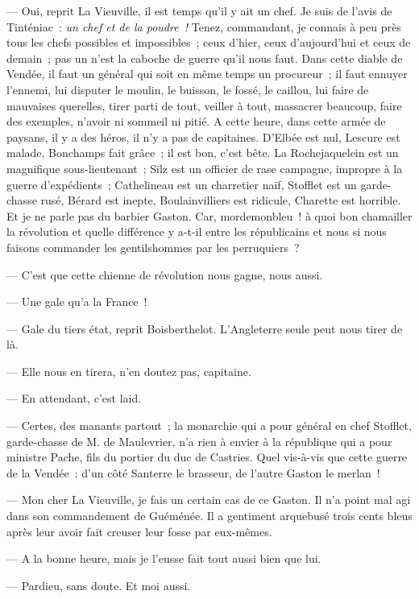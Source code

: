 \documentclass[french,twoside]{book} %
\begin{document}
— Oui, reprit La Vieuville, il est temps qu’il y ait un chef. Je suis de l’avis de Tinténiac : \emph{un chef et de la poudre !} Tenez, commandant, je connais à peu près tous les chefs possibles et impossibles ; ceux d’hier, ceux d’aujourd’hui et ceux de demain ; pas un n’est la caboche de guerre qu’il nous faut. Dans cette diable de Vendée, il faut un général qui soit en même temps un procureur ; il faut ennuyer l’ennemi, lui disputer le moulin, le buisson, le fossé, le caillou, lui faire de mauvaises querelles, tirer parti de tout, veiller à tout, massacrer beaucoup, faire des exemples, n’avoir ni sommeil ni pitié. A cette heure, dans cette armée de paysans, il y a des héros, il n’y a pas de capitaines. D’Elbée est nul, Lescure est malade, Bonchamps fait grâce ; il est bon, c’est bête. La Rochejaquelein est un magnifique sous-lieutenant ; Silz est un officier de rase campagne, impropre à la guerre d’expédients ; Cathelineau est un charretier naïf, Stofflet est un garde-chasse rusé, Bérard est inepte, Boulainvilliers est ridicule, Charette est horrible. Et je ne parle pas  du barbier Gaston. Car, mordemonbleu ! à quoi bon chamailler la révolution et quelle différence y a-t-il entre les républicains et nous si nous faisons commander les gentilshommes par les perruquiers ?\par
— C’est que cette chienne de révolution nous gagne, nous aussi.\par
— Une gale qu’a la France !\par
— Gale du tiers état, reprit Boisberthelot. L’Angleterre seule peut nous tirer de là.\par
— Elle nous en tirera, n’en doutez pas, capitaine.\par
— En attendant, c’est laid.\par
— Certes, des manants partout ; la monarchie qui a pour général en chef Stofflet, garde-chasse de M. de Maulevrier, n’a rien à envier à la république qui a pour ministre Pache, fils du portier du duc de Castries. Quel vis-à-vis que cette guerre de la Vendée : d’un côté Santerre le brasseur, de l’autre Gaston le merlan !\par
— Mon cher La Vieuville, je fais un certain cas de ce Gaston. Il n’a point mal agi dans son commandement de Guéménée. Il a gentiment arquebusé trois cents bleus après leur avoir fait creuser leur fosse par eux-mêmes.\par
— A la bonne heure, mais je l’eusse fait tout aussi bien que lui.\par
— Pardieu, sans doute. Et moi aussi.\par
\end{document}
